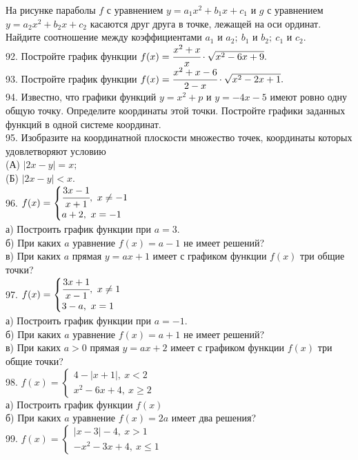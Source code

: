 \documentclass[12pt]{article}
\begin{document}
На рисунке параболы $f$ с уравнением $y=a_1 x^2+b_1x+c_1$ и $g$ с уравнением $y=a_2 x^2+b_2x+c_2$ касаются друг друга в точке, лежащей на оси ординат. Найдите соотношение между коэффициентами $a_1$ и $a_2;\ b_1$ и $b_2;\ c_1$ и $c_2.$\\
92. Постройте график функции $f(x)=\cfrac{x^2+x}{x}\cdot\sqrt{x^2-6x+9}.$\\
93. Постройте график функции $f(x)=\cfrac{x^2+x-6}{2-x}\cdot\sqrt{x^2-2x+1}.$\\
94. Известно, что графики функций $y=x^2+p$ и $y=-4x-5$ имеют ровно одну общую точку. Определите координаты этой точки. Постройте графики заданных функций в одной системе координат.\\
95. Изобразите на координатной плоскости множество точек, координаты которых удовлетворяют условию\\
(А) $|2x-y|=x;$\\
(Б) $|2x-y|<x.$\\
96. $f(x)=\begin{cases} \cfrac{3x-1}{x+1},\ x\neq-1\\a+2,\ x=-1 \end{cases}$\\
а) Построить график функции при $a=3.$\\
б) При каких $a$ уравнение $f(x)=a-1$ не имеет решений?\\
в) При каких $a$ прямая $y=ax+1$ имеет с графиком функции $f(x)$ три общие точки?\\
97. $f(x)=\begin{cases} \cfrac{3x+1}{x-1},\ x\neq1\\3-a,\ x=1 \end{cases}$\\
а) Построить график функции при $a=-1.$\\
б) При каких $a$ уравнение $f(x)=a+1$ не имеет решений?\\
в) При каких $a>0$ прямая $y=ax+2$ имеет с графиком функции $f(x)$ три общие точки?\\
98. $f(x)=\begin{cases} 4-|x+1|,\ x<2\\ x^2-6x+4,\ x\geqslant 2\end{cases}$\\
а) Построить график функции $f(x)$\\
б) При каких $a$ уравнение $f(x)=2a$ имеет два решения?\\
99. $f(x)=\begin{cases} |x-3|-4,\ x>1\\ -x^2-3x+4,\ x\leqslant 1\end{cases}$\\
\end{document}
